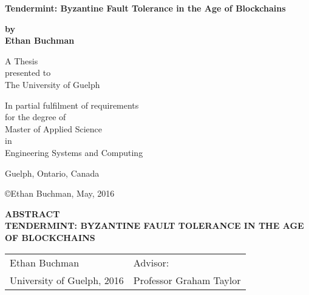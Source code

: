 
\begin{titlepage}
    \begin{center}
        \vspace*{1cm}
        
        \textbf{\large{Tendermint: Byzantine Fault Tolerance in the Age of Blockchains}}\\
        
        \vspace{1 cm}

        \textbf{by} \\
        \vspace{1 cm}
        \textbf{Ethan Buchman}
        
        \vfill
        
        A Thesis \\
	presented to \\
	The University of Guelph 

        \vspace{0.8cm}

	In partial fulfilment of requirements \\
	for the degree of \\
	Master of Applied Science \\
       	in \\
	Engineering Systems and Computing

	\vspace{0.8cm}
	Guelph, Ontario, Canada

	\vspace{0.8cm}
	\copyright Ethan Buchman, May, 2016
    \end{center}
\end{titlepage}

\clearpage

\thispagestyle{plain}
\begin{center}
    \textbf{ABSTRACT} \\ 
    \vspace{0.6cm}
    \textbf{TENDERMINT: BYZANTINE FAULT TOLERANCE IN THE AGE OF BLOCKCHAINS}
\end{center}
    
\vspace{0.6cm}
\begin{tabular}{ p{} p{} }
Ethan Buchman & Advisor:\\ 
University of Guelph, 2016 & Professor Graham Taylor
\end{tabular}


